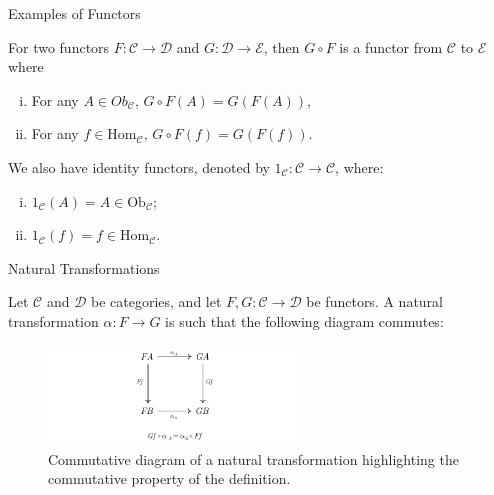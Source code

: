 \documentclass[aspectratio=169,xcolor=dvipsnames,10pt]{beamer}
\theoremstyle{definition}
\begin{document}
\begin{frame}[fragile]{Examples of Functors}

    \begin{definition}
        For two functors $F:\mathcal C \to \mathcal D$
        and $G:\mathcal D \to \mathcal E$, then $G \circ F$ is
        a functor from $\mathcal C$ to $\mathcal E$ where
        \begin{enumerate}[(i)]
            \item For any $A \in Ob_\mathcal C$, $G\circ F (A) = G(F(A))$,
            \item For any $f \in \text{Hom}_\mathcal C$, $G\circ F (f) = G(F(f))$.
        \end{enumerate}

        We also have identity functors, denoted by $1_\mathcal C : \mathcal C \to \mathcal C$,
        where:
        \begin{enumerate}[(i)]
            \item $1_\mathcal C (A) = A \in \text{Ob}_\mathcal C$;
            \item $1_\mathcal C (f) = f \in \text{Hom}_\mathcal C$.
        \end{enumerate}
    \end{definition}
\end{frame}

\begin{frame}[fragile]{Natural Transformations}
	\begin{definition}
		Let $\mathcal C$ and $\mathcal D$ be categories, and let $F,G:\mathcal C \to \mathcal D$ be functors.
		A natural transformation $\alpha: F \to G$ is such that the following diagram commutes:
		\begin{figure}[H]
			\begin{center}
				\includegraphics[width=0.60\textwidth]{./figs/NaturalTransformation.pdf}
			\end{center}
			\caption{Commutative diagram of a natural transformation highlighting the commutative property of the definition.}
			\label{fig:NaturalTransformation}
		\end{figure}
	\end{definition}
\end{frame}
\end{document}
